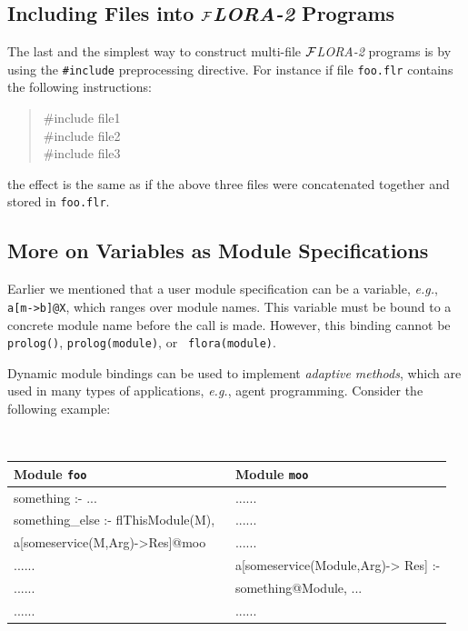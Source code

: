 \documentclass[11pt]{article}
\newcommand{\FLORA}{{\mbox{${\cal F}${\small\it LORA}\rm\emph{-2}}}\xspace}
\begin{document}
\subsection{Including Files into \FLORA Programs}

The last and the simplest way to construct multi-file \FLORA 
programs is by using the {\tt \#include} preprocessing directive.
For instance if file {\tt foo.flr} contains the following instructions:
\begin{quote}
  \#include file1 \\
  \#include file2\\
  \#include file3
\end{quote}
the effect is the same as if the above three files were concatenated
together and stored in {\tt foo.flr}.

\subsection{More on Variables as Module Specifications}

Earlier we mentioned that a user module specification can be a variable, {\it
  e.g.}, {\tt a[m->b]@X}, which ranges over module names. This variable
must be bound to a concrete module name before the call is made. However,
this binding cannot be {\tt prolog()}, {\tt prolog(module)}, or {\tt
  flora(module)}.

Dynamic module bindings can be used to implement \emph{adaptive methods},
which are used in  many types of applications, {\it e.g.}, agent
programming. Consider the following example:
  \begin{center}
    {\tt
    \begin{tabular}{l l}
      Module {\tt foo}  & Module {\tt moo} \\
      \hline
      something :- ... & ......\\
      something\_else :- flThisModule(M), & ......\\
      \hspace*{1.5cm}a[someservice(M,Arg)->Res]@moo ~~& ......\\
      ...... & a[someservice(Module,Arg)-> Res] :- \\
      ...... & \hspace*{2.2cm} something@Module, ...\\
      ...... & ......
      
    \end{tabular}
    }
  \end{center}
  
\end{document}
